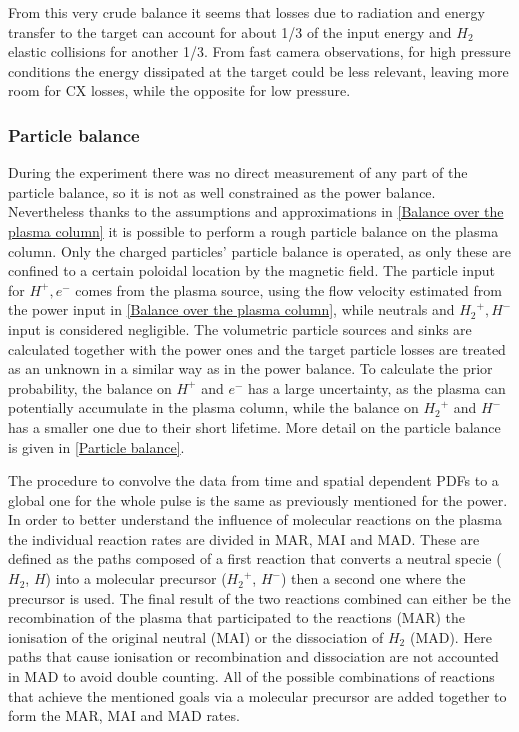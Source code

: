 From this very crude balance it seems that losses due to radiation and energy transfer to the target can account for about 1/3 of the input energy and $H_2$ elastic collisions for another 1/3. From fast camera observations, for high pressure conditions the energy dissipated at the target could be less relevant, leaving more room for CX losses, while the opposite for low pressure.

\subsubsection{Particle balance}\label{Particle balance bayesian}
During the experiment there was no direct measurement of any part of the particle balance, so it is not as well constrained as the power balance. Nevertheless thanks to the assumptions and approximations in \autoref{Balance over the plasma column} it is possible to perform a rough particle balance on the plasma column. Only the charged particles' particle balance is operated, as only these are confined to a certain poloidal location by the magnetic field. The particle input for $H^+, e^-$ comes from the plasma source, using the flow velocity estimated from the power input in \autoref{Balance over the plasma column}, while neutrals and ${H_2}^+, H^-$ input is considered negligible. The volumetric particle sources and sinks are calculated together with the power ones and the target particle losses are treated as an unknown in a similar way as in the power balance. To calculate the prior probability, the balance on $H^+$ and $e^-$ has a large uncertainty, as the plasma can potentially accumulate in the plasma column, while the balance on ${H_2}^+$ and $H^-$ has a smaller one due to their short lifetime. More detail on the particle balance is given in \ref{Particle balance}. 

The procedure to convolve the data from time and spatial dependent PDFs to a global one for the whole pulse is the same as previously mentioned for the power. In order to better understand the influence of molecular reactions on the plasma the individual reaction rates are divided in MAR, MAI and MAD. These are defined as the paths composed of a first reaction that converts a neutral specie ($H_2$, $H$) into a molecular precursor (${H_2}^+$, $H^-$) then a second one where the precursor is used. The final result of the two reactions combined can either be the recombination of the plasma that participated to the reactions (MAR) the ionisation of the original neutral (MAI) or the dissociation of $H_2$ (MAD). Here paths that cause ionisation or recombination and dissociation are not accounted in MAD to avoid double counting. All of the possible combinations of reactions that achieve the mentioned goals via a molecular precursor are added together to form the MAR, MAI and MAD rates.\cite{Verhaegh2020} 


